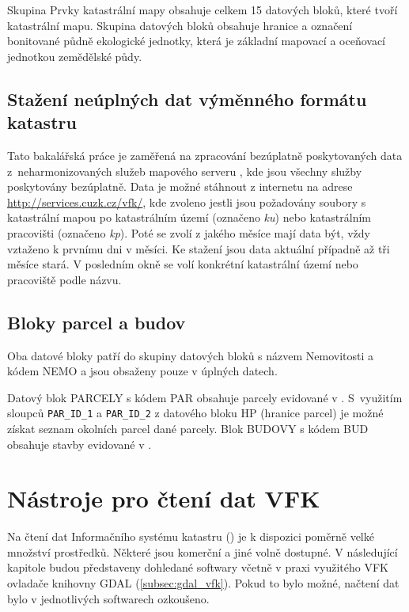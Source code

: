 Skupina Prvky katastrální mapy obsahuje celkem 15 datových bloků,
které tvoří katastrální mapu. Skupina datových bloků 
obsahuje hranice a označení bonitované půdně ekologické jednotky,
která je základní mapovací a oceňovací jednotkou zemědělské půdy.
\subsection{Stažení neúplných dat výměnného formátu katastru}
Tato bakalářská práce je zaměřená na zpracování bezúplatně
poskytovaných data z~neharmonizovaných služeb mapového serveru
, kde jsou všechny služby poskytovány bezúplatně. Data je
možné stáhnout z internetu na adrese \\
\href{http://services.cuzk.cz/vfk/}{http://services.cuzk.cz/vfk/}, kde
 zvoleno jestli jsou požadovány soubory s katastrální mapou po
 katastrálním území (označeno \textit{ku}) nebo katastrálním
pracovišti (označeno \textit{kp}). Poté se zvolí z jakého měsíce mají
data být, vždy vztaženo k prvnímu dni v měsíci. Ke stažení jsou data
aktuální případně až tři měsíce stará. V posledním okně se volí
konkrétní katastrální území nebo pracoviště podle názvu.
\subsection{Bloky parcel a budov}
\label{subsec:bloky_par_bud}
Oba datové bloky patří do skupiny datových bloků s názvem Nemovitosti
a kódem NEMO a jsou obsaženy pouze v úplných datech.

Datový blok PARCELY s kódem PAR obsahuje parcely evidované v
. S~využitím sloupců \verb|PAR_ID_1| a \verb|PAR_ID_2| z
datového bloku HP (hranice parcel) je možné získat seznam okolních
parcel dané parcely. Blok BUDOVY s kódem BUD obsahuje stavby evidované
v .
 
\section{Nástroje pro čtení dat VFK}
Na čtení dat Informačního systému katastru () je k dispozici
poměrně velké množství prostředků. Některé jsou komerční a jiné volně
dostupné. V následující kapitole budou představeny dohledané softwary
včetně v praxi využitého VFK ovladače knihovny GDAL
(\ref{subsec:gdal_vfk}). Pokud to bylo možné, načtení dat bylo v
jednotlivých softwarech ozkoušeno.
